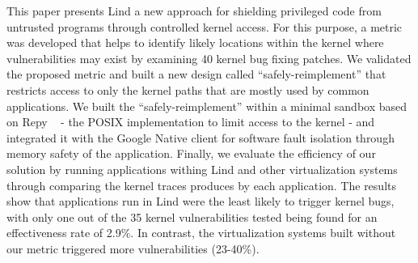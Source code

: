 



This paper presents Lind a new approach for shielding privileged code from untrusted programs through controlled kernel access. For this purpose, a metric was developed that helps to identify likely locations within the kernel where vulnerabilities may exist by examining 40 kernel bug fixing patches. We validated the proposed metric and built a new design %
called ``safely-reimplement'' that restricts access to only the
kernel paths that are mostly used by common applications. 
We built the  ``safely-reimplement'' within a minimal sandbox based on Repy ~\cite{Repy-10} - the POSIX implementation to limit access to the kernel - and  integrated it with the Google Native client for software fault isolation through memory safety of the application. Finally, we evaluate the efficiency of our solution by running applications withing Lind and other virtualization systems through comparing the kernel traces produces by each application. The results show that applications run in Lind were the least likely to trigger kernel bugs, with only one out of the 35 kernel vulnerabilities tested being found for an effectiveness rate of 2.9\%. In contrast, the virtualization systems built without our metric triggered more vulnerabilities (23-40\%).  

